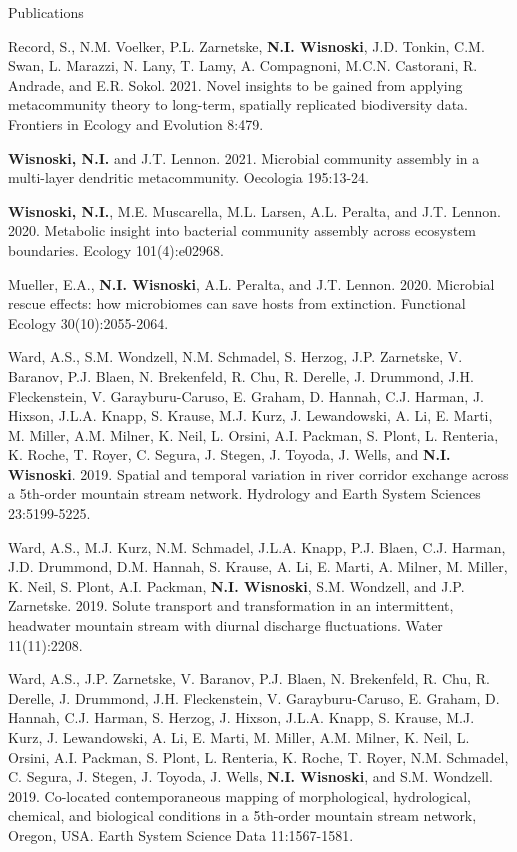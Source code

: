 \documentclass{resume} %
\begin{document}
\begin{rSection}{Publications}
\begin{etaremune}
\item Record, S., N.M. Voelker, P.L. Zarnetske, {\bf N.I. Wisnoski}, J.D. Tonkin, C.M. Swan, L. Marazzi, N. Lany, T. Lamy, A. Compagnoni, M.C.N. Castorani, R. Andrade, and E.R. Sokol. 2021. Novel insights to be gained from applying metacommunity theory to long-term, spatially replicated biodiversity data. Frontiers in Ecology and Evolution 8:479.

\item {\bf Wisnoski, N.I.} and J.T. Lennon. 2021. Microbial community assembly in a multi-layer dendritic metacommunity. Oecologia 195:13-24.

\item {\bf Wisnoski, N.I.}, M.E. Muscarella, M.L. Larsen, A.L. Peralta, and J.T. Lennon. 2020. Metabolic insight into bacterial community assembly across ecosystem boundaries. Ecology 101(4):e02968.

\item Mueller, E.A., {\bf N.I. Wisnoski}, A.L. Peralta, and J.T. Lennon. 2020. Microbial rescue effects: how microbiomes can save hosts from extinction. Functional Ecology 30(10):2055-2064.

\item Ward, A.S., S.M. Wondzell, N.M. Schmadel, S. Herzog, J.P. Zarnetske, V. Baranov, P.J. Blaen, N. Brekenfeld, R. Chu, R. Derelle, J. Drummond, J.H. Fleckenstein, V. Garayburu-Caruso, E. Graham, D. Hannah, C.J. Harman, J. Hixson, J.L.A. Knapp, S. Krause, M.J. Kurz, J. Lewandowski, A. Li, E. Marti, M. Miller, A.M. Milner, K. Neil, L. Orsini, A.I. Packman, S. Plont, L. Renteria, K. Roche, T. Royer, C. Segura, J. Stegen, J. Toyoda, J. Wells, and {\bf N.I. Wisnoski}. 2019. Spatial and temporal variation in river corridor exchange across a 5th-order mountain stream network. Hydrology and Earth System Sciences 23:5199-5225.

\item Ward, A.S., M.J. Kurz, N.M. Schmadel, J.L.A. Knapp, P.J. Blaen, C.J. Harman, J.D. Drummond, D.M. Hannah, S. Krause, A. Li, E. Marti, A. Milner, M. Miller, K. Neil, S. Plont, A.I. Packman, {\bf N.I. Wisnoski}, S.M. Wondzell, and J.P. Zarnetske. 2019. Solute transport and transformation in an intermittent, headwater mountain stream with diurnal discharge fluctuations. Water 11(11):2208.

\item Ward, A.S., J.P. Zarnetske, V. Baranov, P.J. Blaen, N. Brekenfeld, R. Chu, R. Derelle, J. Drummond, J.H. Fleckenstein, V. Garayburu-Caruso, E. Graham, D. Hannah, C.J. Harman, S. Herzog, J. Hixson, J.L.A. Knapp, S. Krause, M.J. Kurz, J. Lewandowski, A. Li, E. Marti, M. Miller, A.M. Milner, K. Neil, L. Orsini, A.I. Packman, S. Plont, L. Renteria, K. Roche, T. Royer, N.M. Schmadel, C. Segura, J. Stegen, J. Toyoda, J. Wells, {\bf N.I. Wisnoski}, and S.M. Wondzell. 2019. Co-located contemporaneous mapping of morphological, hydrological, chemical, and biological conditions in a 5th-order mountain stream network, Oregon, USA. Earth System Science Data 11:1567-1581.


\end{etaremune}
\end{rSection}
\end{document}
